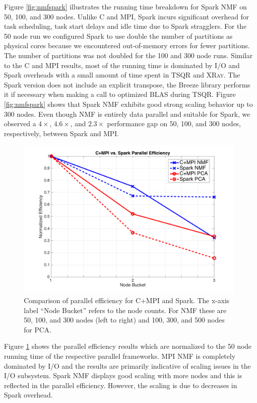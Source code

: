Figure \ref{fig:nmfspark} illustrates the running time breakdown for Spark NMF on 50, 100, and 300 nodes. Unlike C and MPI, Spark incurs significant overhead for task scheduling, task start delays and idle time due to Spark stragglers. For the 50 node run we configured Spark to use double the number of partitions as physical cores because we encountered out-of-memory errors for fewer partitions. The number of partitions was not doubled for the 100 and 300 node runs. Similar to the C and MPI results, most of the running time is dominated by I/O and Spark overheads with a small amount of time spent in TSQR and \textsc{XRay}. The Spark version does not include an explicit transpose, the Breeze library performs it if necessary when making a call to optimized BLAS during TSQR. Figure \ref{fig:nmfspark} shows that Spark NMF exhibits good strong scaling behavior up to 300 nodes.  Even though NMF is entirely data parallel and suitable for Spark, we observed a $4\times$, $4.6\times$, and $2.3\times$ performance gap on 50, 100, and 300 nodes, respectively, between Spark and MPI.

\begin{figure}[h]
\centering
\includegraphics[width=\textwidth]{fig/peff.png}
\caption{Comparison of parallel efficiency for C+MPI and Spark. The x-axis label ``Node Bucket'' refers to the node counts. For NMF these are 50, 100, and 300 nodes (left to right) and 100, 300, and 500 nodes for PCA.}
\label{fig:peff}
\end{figure}

Figure \ref{fig:peff} shows the parallel efficiency results which are normalized to the 50 node running time of the respective parallel frameworks. MPI NMF is completely dominated by I/O and the results are primarily indicative of scaling issues in the I/O subsystem. Spark NMF displays good scaling with more nodes and this is reflected in the parallel efficiency. However, the scaling is due to decreases in Spark overhead.

